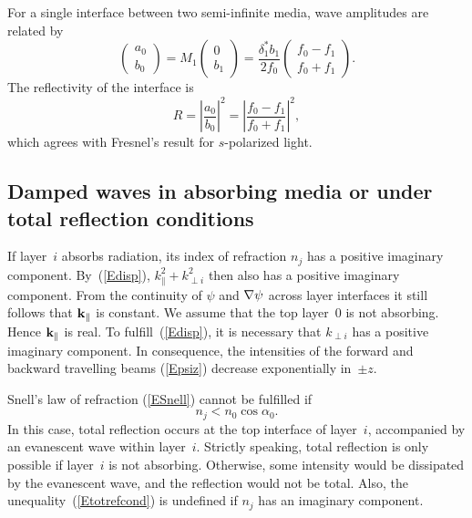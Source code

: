 For a single interface between two semi-infinite media,
wave amplitudes are related by
\begin{equation}
    \left(\begin{array}{c}a_0\\b_0\end{array}\right)
  = M_1
    \left(\begin{array}{c}0\\b_1\end{array}\right)
  = \frac{\delta_1^* b_1}{2 f_0}
    \left(\begin{array}{c}f_0-f_1\\f_0+f_1\end{array}\right).
\end{equation}
The reflectivity of the interface is
\begin{equation}\label{ER01}
  R={\left|\frac{a_0}{b_0}\right|}^2
   ={\left|\frac{f_0-f_1}{f_0+f_1}\right|}^2,
\end{equation}
which agrees with Fresnel's result for $s$-polarized light.


\subsection{Damped waves in absorbing media
  or under total reflection conditions}\label{s:complex}

If layer~$i$ absorbs radiation,
its index of refraction $n_j$ has a positive imaginary component.
By~(\ref{Edisp}),
$k_\parallel^2+k_{\perp i}^2$ then also has a positive imaginary component.
From the continuity of $\psi$ and $\mathbf{\nabla}\psi$ across layer interfaces
it still follows that $\mathbf{k}_\parallel$ is constant.
We assume that the top layer~0 is not absorbing.
Hence $\mathbf{k}_\parallel$ is real.
To fulfill~(\ref{Edisp}),
it is necessary that $k_{\perp i}$
has a positive imaginary component.
In consequence,
the intensities of the forward and backward travelling beams (\ref{Epsiz})
decrease exponentially in~$\pm z$.

Snell's law of refraction (\ref{ESnell})
cannot be fulfilled if
\begin{equation}\label{Etotrefcond}
  n_j<n_0\cos\alpha_0.  
\end{equation}
In this case, total reflection occurs at the top interface of layer~$i$,
accompanied by an evanescent wave within layer~$i$.
Strictly speaking,
total reflection is only possible if layer~$i$ is not absorbing.
Otherwise, some intensity would be dissipated by the evanescent wave,
and the reflection would not be total.
Also, the unequality~(\ref{Etotrefcond}) is undefined
if $n_j$ has an imaginary component.

